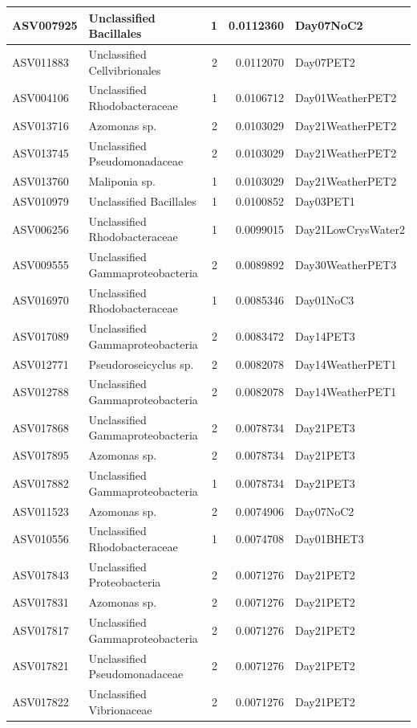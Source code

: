 \documentclass[
]{article}
\begin{document}
\begin{table}[H]
\begin{tabular}{l|l|r|r|l}
\hline
ASV007925 & Unclassified Bacillales & 1 & 0.0112360 & Day07NoC2\\
\hline
ASV011883 & Unclassified Cellvibrionales & 2 & 0.0112070 & Day07PET2\\
\hline
ASV004106 & Unclassified Rhodobacteraceae & 1 & 0.0106712 & Day01WeatherPET2\\
\hline
ASV013716 & Azomonas sp. & 2 & 0.0103029 & Day21WeatherPET2\\
\hline
ASV013745 & Unclassified Pseudomonadaceae & 2 & 0.0103029 & Day21WeatherPET2\\
\hline
ASV013760 & Maliponia sp. & 1 & 0.0103029 & Day21WeatherPET2\\
\hline
ASV010979 & Unclassified Bacillales & 1 & 0.0100852 & Day03PET1\\
\hline
ASV006256 & Unclassified Rhodobacteraceae & 1 & 0.0099015 & Day21LowCrysWater2\\
\hline
ASV009555 & Unclassified Gammaproteobacteria & 2 & 0.0089892 & Day30WeatherPET3\\
\hline
ASV016970 & Unclassified Rhodobacteraceae & 1 & 0.0085346 & Day01NoC3\\
\hline
ASV017089 & Unclassified Gammaproteobacteria & 2 & 0.0083472 & Day14PET3\\
\hline
ASV012771 & Pseudoroseicyclus sp. & 2 & 0.0082078 & Day14WeatherPET1\\
\hline
ASV012788 & Unclassified Gammaproteobacteria & 2 & 0.0082078 & Day14WeatherPET1\\
\hline
ASV017868 & Unclassified Gammaproteobacteria & 2 & 0.0078734 & Day21PET3\\
\hline
ASV017895 & Azomonas sp. & 2 & 0.0078734 & Day21PET3\\
\hline
ASV017882 & Unclassified Gammaproteobacteria & 1 & 0.0078734 & Day21PET3\\
\hline
ASV011523 & Azomonas sp. & 2 & 0.0074906 & Day07NoC2\\
\hline
ASV010556 & Unclassified Rhodobacteraceae & 1 & 0.0074708 & Day01BHET3\\
\hline
ASV017843 & Unclassified Proteobacteria & 2 & 0.0071276 & Day21PET2\\
\hline
ASV017831 & Azomonas sp. & 2 & 0.0071276 & Day21PET2\\
\hline
ASV017817 & Unclassified Gammaproteobacteria & 2 & 0.0071276 & Day21PET2\\
\hline
ASV017821 & Unclassified Pseudomonadaceae & 2 & 0.0071276 & Day21PET2\\
\hline
ASV017822 & Unclassified Vibrionaceae & 2 & 0.0071276 & Day21PET2\\

\end{tabular}
\end{table}
\end{document}
